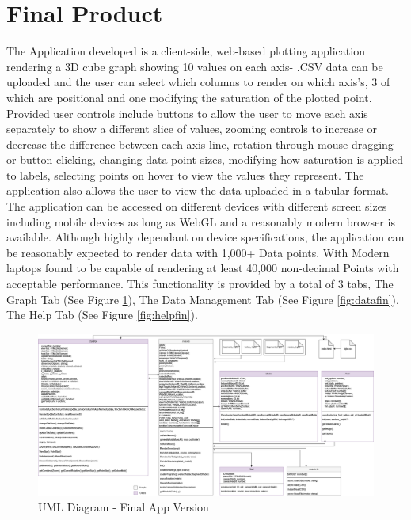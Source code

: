 \section{Final Product}
The Application developed is a client-side, web-based plotting application rendering a 3D cube graph showing 10 values on each axis- .CSV data can be uploaded and the user can select which columns to render on which axis's, 3 of which are positional and one modifying the saturation of the plotted point.
Provided user controls include buttons to allow the user to move each axis separately to show a different slice of values, zooming controls to increase or decrease the difference between each axis line, rotation through mouse dragging or button clicking, changing data point sizes, modifying how saturation is applied to labels, selecting points on hover to view the values they represent. The application also allows the user to view the data uploaded in a tabular format.
The application can be accessed on different devices with different screen sizes including mobile devices as long as WebGL and a reasonably modern browser is available. Although highly dependant on device specifications, the application can be reasonably expected to render data with 1,000+ Data points. With Modern laptops found to be capable of rendering at least 40,000 non-decimal Points with acceptable performance.
This functionality is provided by a total of 3 tabs, The Graph Tab (See Figure \ref{fig:graphfin}), The Data Management Tab (See Figure \ref{fig:datafin}), The Help Tab (See Figure \ref{fig:helpfin}).

\begin{figure}[h]
    \centering
    \includegraphics[width=1\textwidth]{author-files/figures/UML_All_fin.drawio.png}
    \caption{UML Diagram - Final App Version}
    \label{fig:graphfin}
\end{figure}